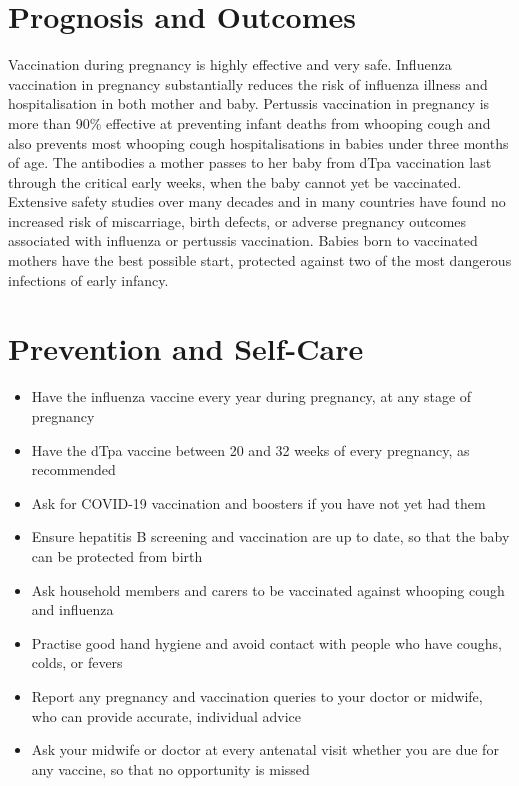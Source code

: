 \section*{Prognosis and Outcomes}
Vaccination during pregnancy is highly effective and very safe. Influenza vaccination in pregnancy substantially reduces the risk of influenza illness and hospitalisation in both mother and baby. Pertussis vaccination in pregnancy is more than 90\% effective at preventing infant deaths from whooping cough and also prevents most whooping cough hospitalisations in babies under three months of age. The antibodies a mother passes to her baby from dTpa vaccination last through the critical early weeks, when the baby cannot yet be vaccinated. Extensive safety studies over many decades and in many countries have found no increased risk of miscarriage, birth defects, or adverse pregnancy outcomes associated with influenza or pertussis vaccination. Babies born to vaccinated mothers have the best possible start, protected against two of the most dangerous infections of early infancy.

\section*{Prevention and Self-Care}
\begin{itemize}
    \item Have the influenza vaccine every year during pregnancy, at any stage of pregnancy
    \item Have the dTpa vaccine between 20 and 32 weeks of every pregnancy, as recommended
    \item Ask for COVID-19 vaccination and boosters if you have not yet had them
    \item Ensure hepatitis B screening and vaccination are up to date, so that the baby can be protected from birth
    \item Ask household members and carers to be vaccinated against whooping cough and influenza
    \item Practise good hand hygiene and avoid contact with people who have coughs, colds, or fevers
    \item Report any pregnancy and vaccination queries to your doctor or midwife, who can provide accurate, individual advice
    \item Ask your midwife or doctor at every antenatal visit whether you are due for any vaccine, so that no opportunity is missed
\end{itemize}

